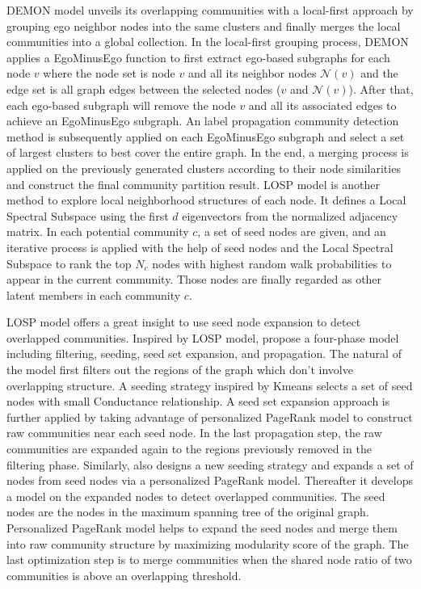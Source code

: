DEMON model \cite{coscia2012demon} unveils its overlapping communities with a local-first approach by grouping ego neighbor nodes into the same clusters and finally merges the local communities into a global collection. In the local-first grouping process, DEMON applies a EgoMinusEgo function to first extract ego-based subgraphs for each node $v$ where the node set is node $v$ and all its neighbor nodes $\mathcal{N}(v)$  and the edge set is all graph edges between the selected nodes ($v$ and $\mathcal{N}(v)$). After that, each ego-based subgraph will remove the node $v$ and all its associated edges to achieve an EgoMinusEgo subgraph. An label propagation community detection method is subsequently applied on each EgoMinusEgo subgraph and select a set of largest clusters to best cover the entire graph. In the end, a merging process is applied on the previously generated clusters according to their node similarities and construct the final community partition result. LOSP model \cite{he2015detecting} is another method to explore local neighborhood structures of each node. It defines a Local Spectral Subspace using the first $d$ eigenvectors from the normalized adjacency matrix. In each potential community $c$, a set of seed nodes are given, and an iterative process is applied with the help of seed nodes and the Local Spectral Subspace to rank the top $N_c$ nodes with highest random walk probabilities to appear in the current community. Those nodes are finally regarded as other latent members in each community $c$. 

LOSP model offers a great insight to use seed node expansion to detect overlapped communities. Inspired by LOSP model, \cite{whang2013overlapping,whang2016overlapping} propose a four-phase model including filtering, seeding, seed set expansion, and propagation. The natural of the model first filters out the regions of the graph which don't involve overlapping structure. A seeding strategy inspired by Kmeans selects a set of seed nodes with small Conductance relationship. A seed set expansion approach is further applied by taking advantage of personalized PageRank model to construct raw communities near each seed node. In the last propagation step, the raw communities are expanded again to the regions previously removed in the filtering phase. Similarly, \cite{yang2017finding} also designs a new seeding strategy and expands a set of nodes from seed nodes via a personalized PageRank model. Thereafter it develops a model on the expanded nodes to detect overlapped communities. The seed nodes are the nodes in the maximum spanning tree of the original graph. Personalized PageRank model helps to expand the seed nodes and merge them into raw community structure by maximizing modularity score of the graph. The last optimization step is to merge communities when the shared node ratio of two communities is above an overlapping threshold.

